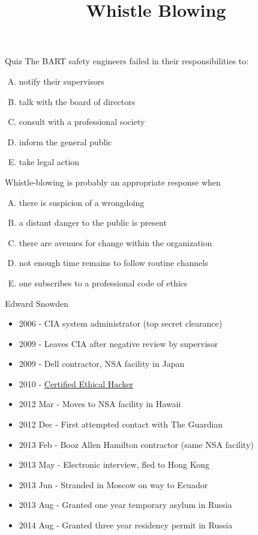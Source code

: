 \documentclass{beamer}
\title{Whistle Blowing}
\date{}
\begin{document}
\begin{frame}
\titlepage
\end{frame}

\begin{frame}{Quiz}
The BART safety engineers failed in their responsibilities to:
\begin{enumerate}[(A)]
\item<1> notify their supervisors
\item<1> talk with the board of directors
\item<1> consult with a professional society
\item<1-2> inform the general public %
\item<1> take legal action
\end{enumerate}
\bigskip
Whistle-blowing is probably an appropriate response when
\begin{enumerate}[(A)]
\item<1> there is suspicion of a wrongdoing
\item<1> a distant danger to the public is present
\item<1> there are avenues for change within the organization
\item<1-2> not enough time remains to follow routine channels
\item<1> one subscribes to a professional code of ethics
\end{enumerate}
\end{frame}

\begin{frame}{Edward Snowden}
\begin{itemize}
\item 2006 - CIA system administrator (top secret clearance)
\item 2009 - Leaves CIA after negative review by supervisor
\item 2009 - Dell contractor, NSA facility in Japan
\item 2010 - \href{http://www.nytimes.com/2013/07/05/us/resume-shows-snowden-honed-hacking-skills.html?pagewanted=all&_r=0}{Certified Ethical Hacker}
\item 2012 Mar - Moves to NSA facility in Hawaii
\item 2012 Dec - First attempted contact with The Guardian
\item 2013 Feb - Booz Allen Hamilton contractor (same NSA facility)
\item 2013 May - Electronic interview, fled to Hong Kong
\item 2013 Jun - Stranded in Moscow on way to Ecuador
\item 2013 Aug - Granted one year temporary asylum in Russia
\item 2014 Aug - Granted three year residency permit in Russia
\end{itemize}
\end{frame}
\end{document}
